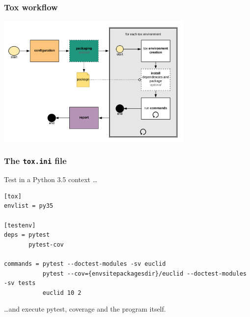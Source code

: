 \documentclass{beamer} %
\begin{document}
\begin{frame}
  \frametitle{Tox workflow}
  \includegraphics[height=65mm]{assets/tox}
\end{frame}


\begin{frame}[fragile]

\frametitle{The \texttt{tox.ini} file}

Test in a Python 3.5 context \ldots 
\begin{scriptsize}
\begin{verbatim}
[tox]
envlist = py35

[testenv]
deps = pytest
       pytest-cov

commands = pytest --doctest-modules -sv euclid
           pytest --cov={envsitepackagesdir}/euclid --doctest-modules -sv tests
           euclid 10 2
\end{verbatim}
\end{scriptsize}
\ldots and execute pytest, coverage and the program itself.

\end{frame}
\end{document}
